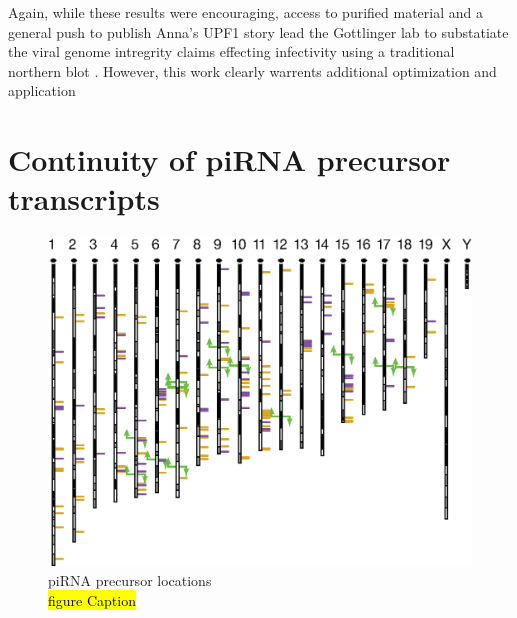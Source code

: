   Again, while these results were encouraging, access to purified material and a general push to publish Anna's UPF1 story lead the Gottlinger lab to substatiate the viral genome intregrity claims effecting infectivity using a traditional northern blot \citep{Serquina2013a}. However, this work clearly warrents additional optimization and application

\section{Continuity of piRNA precursor transcripts}\label{sec: precursor TX}


  \begin{figure}[htbp] %
    \centering 
    \includegraphics{Figures/SeqZipMethod/PrecursorLocations.eps}
    \caption[piRNA precursor locations]
    {
      piRNA precursor locations\\
      \hl{figure Caption}
   	 }
    \label{fig:Hiv tx via SeqZip}
 	 \end{figure}


